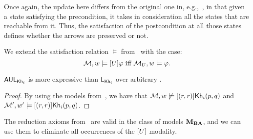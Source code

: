 Once again, the update here differs from the original one in, e.g.,~\cite{KooiR11}, in that given a state satisfying the precondition, it takes in consideration all the states that are reachable from it. Thus, the satisfaction of the postcondition at all those states defines whether the arrows are preserved or not.

\medskip 

\begin{definition}\label{def:arrowupdate}
We extend the satisfaction relation $\models$ from~ with the case:
\[
	\mathcal{M},w \models [U]\varphi \mbox{ iff } \mathcal{M}_{{U}},w \models \varphi.
\]
\end{definition}



\begin{proposition}\label{prop:expaul}
$\mathsf{AUL}_{{\sf Kh}_i}$ is more expressive than $\mathsf{L}_{{\sf Kh}_i}$ over arbitrary \ultss.
\end{proposition}
\begin{proof}
By using the models from~, we have that $\mathcal{M},w \not\models [(r,r)]{\sf Kh}_i(p,q)$ and $\mathcal{M}',w' \models[(r,r)]{\sf Kh}_i(p,q)$.
\end{proof}

The reduction axioms from~ are valid in the class of models $\mathbf{M}_{\mathbf{BA}}$, and we can use them to eliminate all occurrences of the $[U]$ modality. %

